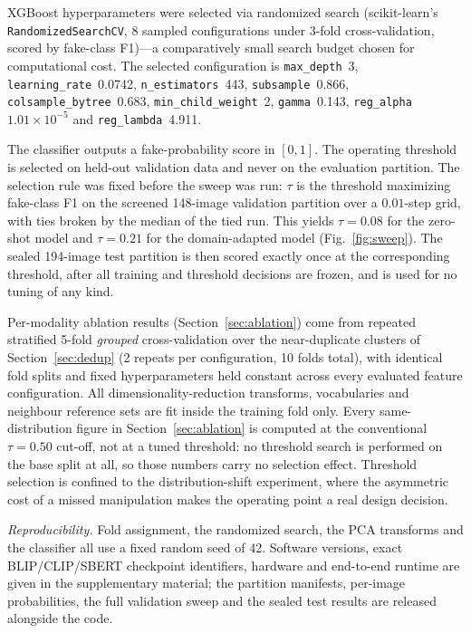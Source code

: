 \documentclass[conference,a4paper]{IEEEtran}
\begin{document}
XGBoost hyperparameters were selected via randomized search (scikit-learn's
\texttt{RandomizedSearchCV}, 8 sampled configurations under 3-fold
cross-validation, scored by fake-class F1)---a comparatively small search
budget chosen for computational cost. The selected configuration is
\texttt{max\_depth}~3, \texttt{learning\_rate}~0.0742,
\texttt{n\_estimators}~443, \texttt{subsample}~0.866,
\texttt{colsample\_bytree}~0.683, \texttt{min\_child\_weight}~2,
\texttt{gamma}~0.143, \texttt{reg\_alpha}~$1.01\times10^{-5}$ and
\texttt{reg\_lambda}~4.911.

The classifier outputs a fake-probability score in $[0,1]$. The operating
threshold is selected on held-out validation data and never on the evaluation
partition. The selection rule was fixed before the sweep was run: $\tau$ is
the threshold maximizing fake-class F1 on the screened 148-image validation
partition over a $0.01$-step grid, with ties broken by the median of the tied
run. This yields $\tau = 0.08$ for the zero-shot model and $\tau = 0.21$ for
the domain-adapted model (Fig.~\ref{fig:sweep}). The sealed 194-image test
partition is then scored exactly once at the corresponding threshold, after
all training and threshold decisions are frozen, and is used for no tuning of
any kind.

Per-modality ablation results (Section~\ref{sec:ablation}) come from repeated
stratified 5-fold \emph{grouped} cross-validation over the near-duplicate
clusters of Section~\ref{sec:dedup} (2 repeats per configuration, 10 folds
total), with identical fold splits and fixed hyperparameters held constant
across every evaluated feature configuration. All dimensionality-reduction
transforms, vocabularies and neighbour reference sets are fit inside the
training fold only. Every same-distribution figure in
Section~\ref{sec:ablation} is computed at the conventional $\tau = 0.50$
cut-off, not at a tuned threshold: no threshold search is performed on the
base split at all, so those numbers carry no selection effect. Threshold
selection is confined to the distribution-shift experiment, where the
asymmetric cost of a missed manipulation makes the operating point a real
design decision.

\emph{Reproducibility.} Fold assignment, the randomized search, the PCA
transforms and the classifier all use a fixed random seed of 42. Software
versions, exact BLIP/CLIP/SBERT checkpoint identifiers, hardware and
end-to-end runtime are given in the supplementary material; the partition
manifests, per-image probabilities, the full validation sweep and the sealed
test results are released alongside the code.
\end{document}
